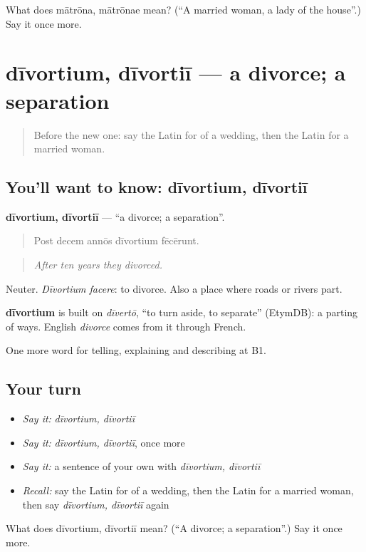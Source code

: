 \begin{tcolorbox}[breakable,colback=teal!4,colframe=teal!35!black,title={Before you move on}]
What does mātrōna, mātrōnae mean? (\textquotedblleft{}A married woman, a lady of the house\textquotedblright{}.) Say it once more.
\end{tcolorbox}
\section[dīvortium, dīvortiī]{dīvortium, dīvortiī — a divorce; a separation}

\label{lesson:LA-C328-divortium}



\begin{quote}
Before the new one: say the Latin for of a wedding, then the Latin for a married woman.
\end{quote}

\subsection*{You'll want to know: dīvortium, dīvortiī}
\textbf{dīvortium, dīvortiī} — \textquotedblleft{}a divorce; a separation\textquotedblright{}.

\begin{quote}
Post decem annōs dīvortium fēcērunt.
\end{quote}

\begin{quote}
\emph{After ten years they divorced.}
\end{quote}

Neuter. \emph{Dīvortium facere}: to divorce. Also a place where roads or rivers part.

\begin{cousinweb}
\textbf{dīvortium} is built on \emph{dīvertō}, \textquotedblleft{}to turn aside, to separate\textquotedblright{} (EtymDB): a parting of ways. English \emph{divorce} comes from it through French.
\end{cousinweb}

\begin{grammarlens}[title={What you've built}]
One more word for telling, explaining and describing at B1.
\end{grammarlens}

\subsection*{Your turn}
\begin{itemize}
\raggedright
  \item \emph{Say it:} \emph{dīvortium, dīvortiī}
  \item \emph{Say it:} \emph{dīvortium, dīvortiī}, once more
  \item \emph{Say it:} a sentence of your own with \emph{dīvortium, dīvortiī}
  \item \emph{Recall:} say the Latin for of a wedding, then the Latin for a married woman, then say \emph{dīvortium, dīvortiī} again
\end{itemize}

\begin{tcolorbox}[breakable,colback=teal!4,colframe=teal!35!black,title={Before you move on}]
What does dīvortium, dīvortiī mean? (\textquotedblleft{}A divorce; a separation\textquotedblright{}.) Say it once more.
\end{tcolorbox}

